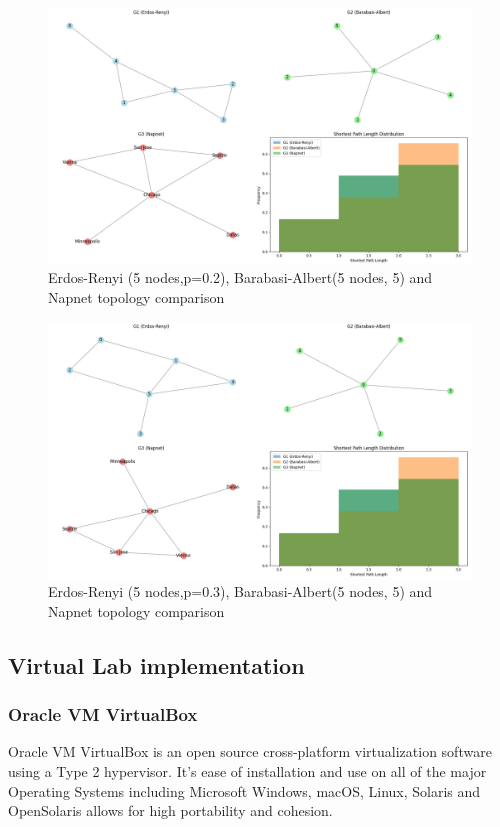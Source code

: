 \begin{figure}
    \centering
    \includegraphics[width=0.7\linewidth]{images/final-topo-comparison/napnet/2_1.png}
    \caption{Erdos-Renyi (5 nodes,p=0.2), Barabasi-Albert(5 nodes, 5) and Napnet topology comparison}
    \label{fig:napnet_2}
\end{figure}

\begin{figure}
    \centering
    \includegraphics[width=0.7\linewidth]{images/final-topo-comparison/napnet/3_1.png}
    \caption{Erdos-Renyi (5 nodes,p=0.3), Barabasi-Albert(5 nodes, 5) and Napnet topology comparison}
    \label{fig:napnet_3}
\end{figure}


\subsection{Virtual Lab implementation}

\subsubsection{Oracle VM VirtualBox}
Oracle VM VirtualBox is an open source cross-platform virtualization software using a Type 2 hypervisor. \cite{VirtualWare} It's ease of installation and use on all of the major Operating Systems including Microsoft Windows, macOS, Linux, Solaris and OpenSolaris \cite{oracleVM} allows for high portability and cohesion. 

